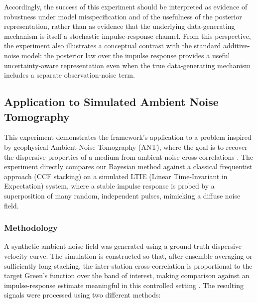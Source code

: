 \documentclass[preprint,1p,times,authoryear]{elsarticle}
\begin{document}
Accordingly, the success of this experiment should be interpreted as evidence of robustness under model misspecification and of the usefulness of the posterior representation, rather than as evidence that the underlying data-generating mechanism is itself a stochastic impulse-response channel. From this perspective, the experiment also illustrates a conceptual contrast with the standard additive-noise model: the posterior law over the impulse response provides a useful uncertainty-aware representation even when the true data-generating mechanism includes a separate observation-noise term.

\subsection{Application to Simulated Ambient Noise Tomography}

This experiment demonstrates the framework's application to a problem inspired by geophysical Ambient Noise Tomography (ANT), where the goal is to recover the dispersive properties of a medium from ambient-noise cross-correlations \citep{Bensen2007,Ekstrom2009}. The experiment directly compares our Bayesian method against a classical frequentist approach (CCF stacking) on a simulated LTIE (Linear Time-Invariant in Expectation) system, where a stable impulse response is probed by a superposition of many random, independent pulses, mimicking a diffuse noise field.


\subsubsection{Methodology}
A synthetic ambient noise field was generated using a ground-truth dispersive velocity curve. The simulation is constructed so that, after ensemble averaging or sufficiently long stacking, the inter-station cross-correlation is proportional to the target Green's function over the band of interest, making comparison against an impulse-response estimate meaningful in this controlled setting \citep{Snieder2004, SanchezSesma2006}. The resulting signals were processed using two different methods:
\end{document}
